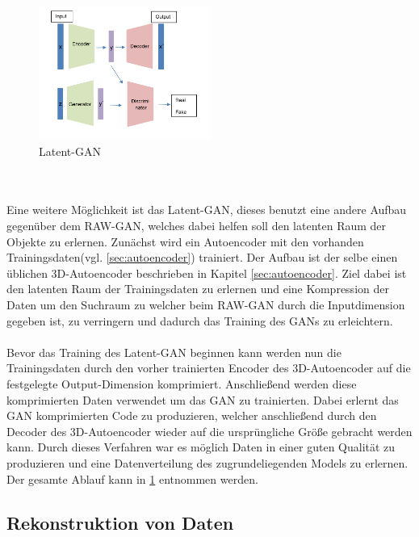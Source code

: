 \documentclass{llncs}
\begin{document}
\begin{figure}[htbp] 
	\centering
	\includegraphics[width=0.5\textwidth]{latentgan.png}
	\caption{Latent-GAN}
	\label{fig:Bild39}
\end{figure}
~\\\\
Eine weitere Möglichkeit ist das Latent-GAN, dieses benutzt eine andere Aufbau gegenüber dem RAW-GAN, welches dabei helfen soll den latenten Raum der Objekte zu erlernen. Zunächst wird ein Autoencoder mit den vorhanden Trainingsdaten(vgl. \ref{sec:autoencoder}) trainiert. Der Aufbau ist der selbe einen üblichen 3D-Autoencoder beschrieben in Kapitel \ref{sec:autoencoder}. Ziel dabei ist den latenten Raum der Trainingsdaten zu erlernen und eine Kompression der Daten um den Suchraum zu  welcher beim RAW-GAN durch die Inputdimension gegeben ist, zu verringern und dadurch das Training des GANs zu erleichtern\cite{3dgan}. 
\\\\
Bevor das Training des Latent-GAN beginnen kann werden nun die Trainingsdaten durch den vorher trainierten Encoder des 3D-Autoencoder auf die festgelegte Output-Dimension komprimiert. Anschließend werden diese komprimierten Daten verwendet um das GAN zu trainierten. Dabei erlernt das GAN komprimierten Code zu produzieren, welcher anschließend durch den Decoder des 3D-Autoencoder wieder auf die ursprüngliche Größe gebracht werden kann. Durch dieses Verfahren war es möglich Daten in einer guten Qualität zu produzieren und eine Datenverteilung des zugrundeliegenden Models zu erlernen. Der gesamte Ablauf kann in \ref{fig:Bild39} entnommen werden\cite{3dgan}. 

\subsection{Rekonstruktion von Daten}\label{sec:rekdaten}
\end{document}
